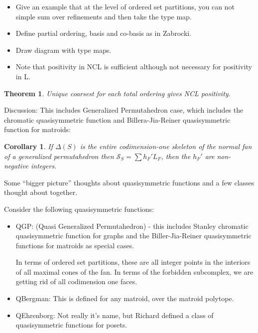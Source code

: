 \documentclass[12pt,reqno]{amsart}
\numberwithin{definition}{section}
\newtheorem{theorem}[definition]{Theorem}
\newtheorem{corollary}[definition]{Corollary}
\newcommand{\SSS}{\mathcal{S}}
\begin{document}
\begin{itemize}
\item Give an example that at the level of ordered set partitions,
you can not simple sum over refinements and then take the type map.

\item Define partial ordering, basis and co-basis as in Zabrocki.

\item Draw diagram with type maps.

\item Note that positivity in NCL is sufficient although not necessary for positivity in L.
\end{itemize}

\begin{theorem} Unique coarsest for each total ordering gives NCL positivity.
\end{theorem}

Discussion: This includes Generalized Permutahedron case, which includes the chromatic quasisymmetric function and Billera-Jia-Reiner quasisymmetric function for matroids:
\begin{corollary}
If $\Delta(S)$ is the entire codimension-one skeleton of the normal fan of a generalized permutahedron
then $\SSS_S = \sum h_F' L_F$, then the $h_F'$ are non-negative integers.
\end{corollary}




Some ``bigger picture'' thoughts about quasisymmetric functions and a few classes thought about together. 

Consider the following quasisymmetric functions:

\begin{itemize}
\item QGP: (Quasi Generalized Permutahedron) - this includes Stanley chromatic quasisymmetric function for graphs and the Biller-Jia-Reiner quasisymmetric functions for matroids as special cases.

In terms of ordered set partitions, these are all integer points in the interiors of all maximal cones of the fan.  In terms of the forbidden subcomplex, we are getting rid of all codimension one faces.  

\item QBergman: This is defined for any matroid, over the matroid polytope.

\item QEhrenborg: Not really it's name, but Richard defined a class of quasisymmetric functions for posets.

\end{itemize}
\end{document}
